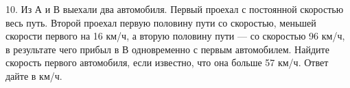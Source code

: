 10. Из А и В выехали два автомобиля. Первый проехал с постоянной скоростью весь путь. Второй проехал первую половину пути со скоростью, меньшей скорости первого на 16 км/ч, а вторую половину пути --- со скоростью 96 км/ч, в результате чего прибыл в В одновременно с первым автомобилем. Найдите скорость первого автомобиля, если известно, что она больше 57 км/ч. Ответ дайте в км/ч.\\

